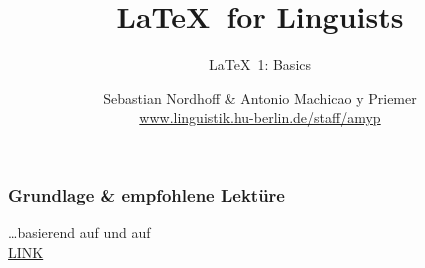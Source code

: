 


\title{
	\LaTeX\ for Linguists
}

\subtitle{\LaTeX\ 1: Basics}

\author[aMyP]{
	{\small Sebastian Nordhoff \& Antonio Machicao y Priemer}
	\\
	{\footnotesize \url{www.linguistik.hu-berlin.de/staff/amyp}}
}








\begin{frame}
  \HUtitle
\end{frame}





\nocite{Freitag&MyP15a}
\nocite{Knuth1986}
\nocite{Kopka94a}
\nocite{MyP17c}
\nocite{MyP&Kerkhof16a}
	



\begin{frame}
\frametitle{Grundlage \& empfohlene Lektüre}

\dots basierend auf \citet{Freitag&MyP15a} und auf \citet{MyP&Kerkhof16a}\\
\ras \href{https://www.researchgate.net/publication/279514740_LATEX-Einfuhrung_fur_Linguisten}{LINK}


\nocite{Kopka94a}

\end{frame}


